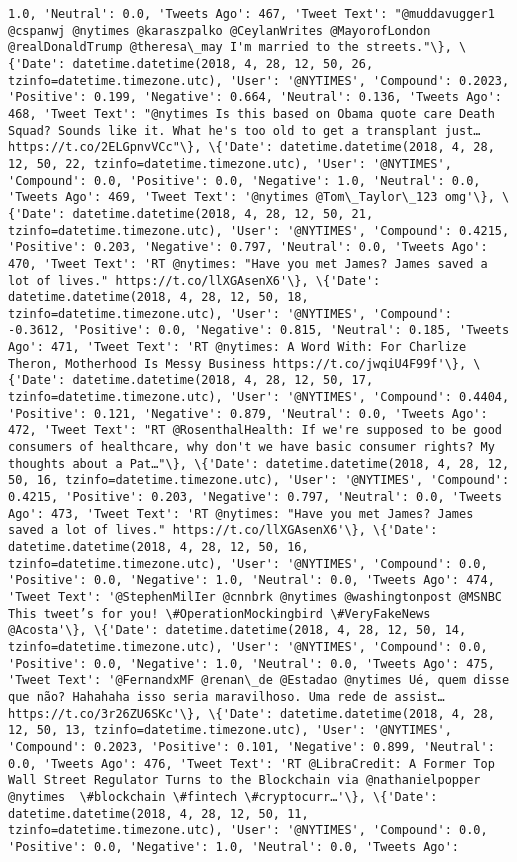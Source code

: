 \documentclass[11pt]{article}
\begin{document}
\begin{Verbatim}[commandchars=\\\{\}]
1.0, 'Neutral': 0.0, 'Tweets Ago': 467, 'Tweet Text': "@muddavugger1 @cspanwj @nytimes @karaszpalko @CeylanWrites @MayorofLondon @realDonaldTrump @theresa\_may I'm married to the streets."\}, \{'Date': datetime.datetime(2018, 4, 28, 12, 50, 26, tzinfo=datetime.timezone.utc), 'User': '@NYTIMES', 'Compound': 0.2023, 'Positive': 0.199, 'Negative': 0.664, 'Neutral': 0.136, 'Tweets Ago': 468, 'Tweet Text': "@nytimes Is this based on Obama quote care Death Squad? Sounds like it. What he's too old to get a transplant just… https://t.co/2ELGpnvVCc"\}, \{'Date': datetime.datetime(2018, 4, 28, 12, 50, 22, tzinfo=datetime.timezone.utc), 'User': '@NYTIMES', 'Compound': 0.0, 'Positive': 0.0, 'Negative': 1.0, 'Neutral': 0.0, 'Tweets Ago': 469, 'Tweet Text': '@nytimes @Tom\_Taylor\_123 omg'\}, \{'Date': datetime.datetime(2018, 4, 28, 12, 50, 21, tzinfo=datetime.timezone.utc), 'User': '@NYTIMES', 'Compound': 0.4215, 'Positive': 0.203, 'Negative': 0.797, 'Neutral': 0.0, 'Tweets Ago': 470, 'Tweet Text': 'RT @nytimes: "Have you met James? James saved a lot of lives." https://t.co/llXGAsenX6'\}, \{'Date': datetime.datetime(2018, 4, 28, 12, 50, 18, tzinfo=datetime.timezone.utc), 'User': '@NYTIMES', 'Compound': -0.3612, 'Positive': 0.0, 'Negative': 0.815, 'Neutral': 0.185, 'Tweets Ago': 471, 'Tweet Text': 'RT @nytimes: A Word With: For Charlize Theron, Motherhood Is Messy Business https://t.co/jwqiU4F99f'\}, \{'Date': datetime.datetime(2018, 4, 28, 12, 50, 17, tzinfo=datetime.timezone.utc), 'User': '@NYTIMES', 'Compound': 0.4404, 'Positive': 0.121, 'Negative': 0.879, 'Neutral': 0.0, 'Tweets Ago': 472, 'Tweet Text': "RT @RosenthalHealth: If we're supposed to be good consumers of healthcare, why don't we have basic consumer rights? My thoughts about a Pat…"\}, \{'Date': datetime.datetime(2018, 4, 28, 12, 50, 16, tzinfo=datetime.timezone.utc), 'User': '@NYTIMES', 'Compound': 0.4215, 'Positive': 0.203, 'Negative': 0.797, 'Neutral': 0.0, 'Tweets Ago': 473, 'Tweet Text': 'RT @nytimes: "Have you met James? James saved a lot of lives." https://t.co/llXGAsenX6'\}, \{'Date': datetime.datetime(2018, 4, 28, 12, 50, 16, tzinfo=datetime.timezone.utc), 'User': '@NYTIMES', 'Compound': 0.0, 'Positive': 0.0, 'Negative': 1.0, 'Neutral': 0.0, 'Tweets Ago': 474, 'Tweet Text': '@StephenMilIer @cnnbrk @nytimes @washingtonpost @MSNBC This tweet’s for you! \#OperationMockingbird \#VeryFakeNews @Acosta'\}, \{'Date': datetime.datetime(2018, 4, 28, 12, 50, 14, tzinfo=datetime.timezone.utc), 'User': '@NYTIMES', 'Compound': 0.0, 'Positive': 0.0, 'Negative': 1.0, 'Neutral': 0.0, 'Tweets Ago': 475, 'Tweet Text': '@FernandxMF @renan\_de @Estadao @nytimes Ué, quem disse que não? Hahahaha isso seria maravilhoso. Uma rede de assist… https://t.co/3r26ZU6SKc'\}, \{'Date': datetime.datetime(2018, 4, 28, 12, 50, 13, tzinfo=datetime.timezone.utc), 'User': '@NYTIMES', 'Compound': 0.2023, 'Positive': 0.101, 'Negative': 0.899, 'Neutral': 0.0, 'Tweets Ago': 476, 'Tweet Text': 'RT @LibraCredit: A Former Top Wall Street Regulator Turns to the Blockchain via @nathanielpopper @nytimes  \#blockchain \#fintech \#cryptocurr…'\}, \{'Date': datetime.datetime(2018, 4, 28, 12, 50, 11, tzinfo=datetime.timezone.utc), 'User': '@NYTIMES', 'Compound': 0.0, 'Positive': 0.0, 'Negative': 1.0, 'Neutral': 0.0, 'Tweets Ago': 
\end{Verbatim}
\end{document}
